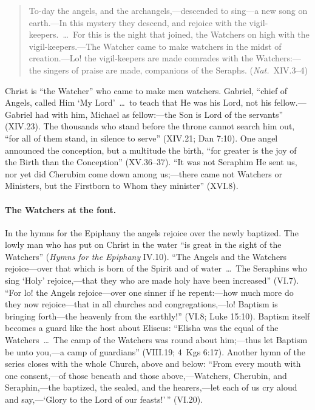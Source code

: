 \begin{quote}
To-day the angels, and the archangels,---descended to sing---a new song on
earth.---In this mystery they descend, and rejoice with the
vigil-keepers.~\dots\ For this is the night that joined, the Watchers on
high with the vigil-keepers.---The Watcher came to make watchers in the
midst of creation.---Lo! the vigil-keepers are made comrades with the
Watchers:---the singers of praise are made, companions of the Seraphs.
(\emph{Nat.}\ XIV.3--4)
\end{quote}

\noindent Christ is ``the Watcher'' who came to make men watchers.
Gabriel, ``chief of Angels, called Him `My Lord'~\dots\ to teach that He
was his Lord, not his fellow.---Gabriel had with him, Michael as fellow:---the
Son is Lord of the servants'' (XIV.23). The thousands who stand before
the throne cannot search him out, ``for all of them stand, in silence to
serve'' (XIV.21; Dan 7:10). One angel announced the conception, but a
multitude the birth, ``for greater is the joy of the Birth than the
Conception'' (XV.36--37). ``It was not Seraphim He sent us, nor yet did
Cherubim come down among us;---there came not Watchers or Ministers, but
the Firstborn to Whom they minister'' (XVI.8).

\paragraph{The Watchers at the font.} In the hymns for the Epiphany the
angels rejoice over the newly baptized. The lowly man who has put on
Christ in the water ``is great in the sight of the Watchers'' (\emph{Hymns
for the Epiphany} IV.10). ``The Angels and the Watchers rejoice---over that
which is born of the Spirit and of water~\dots\ The Seraphins who sing
`Holy' rejoice,---that they who are made holy have been increased'' (VI.7).
``For lo! the Angels rejoice---over one sinner if he repent:---how much more
do they now rejoice---that in all churches and congregations,---lo! Baptism
is bringing forth---the heavenly from the earthly!'' (VI.8; Luke 15:10).
Baptism itself becomes a guard like the host about Eliseus: ``Elisha was
the equal of the Watchers~\dots\ The camp of the Watchers was round about
him;---thus let Baptism be unto you,---a camp of guardians'' (VIII.19; 4~Kgs
 6:17). Another hymn of the series closes with the whole Church,
above and below: ``From
every mouth with one consent,---of those beneath and those above,---Watchers,
Cherubin, and Seraphin,---the baptized, the sealed, and the hearers,---let
each of us cry aloud and say,---`Glory to the Lord of our feasts!'\,''
(VI.20).

